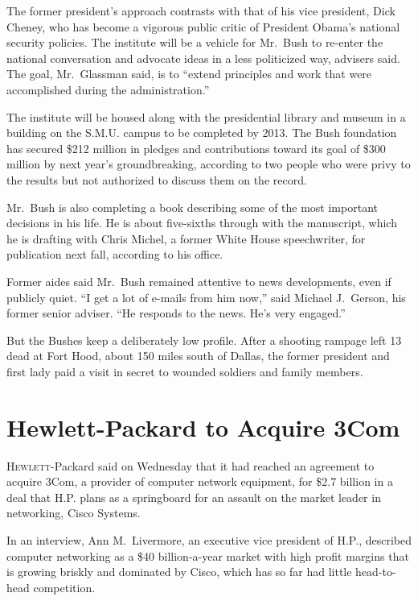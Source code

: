 ﻿\documentclass[12pt]{article}
\begin{document}
The former president's approach contrasts with that of his vice president, Dick Cheney, who has
become a vigorous public critic of President Obama's national security policies. The institute will
be a vehicle for Mr.~Bush to re-enter the national conversation and advocate ideas in a less
politicized way, advisers said. The goal, Mr.~Glassman said, is to ``extend principles and work that
were accomplished during the administration.''

The institute will be housed along with the presidential library and museum in a building on the
S.M.U. campus to be completed by 2013. The Bush foundation has secured \$212 million in pledges and
contributions toward its goal of \$300 million by next year's groundbreaking, according to two
people who were privy to the results but not authorized to discuss them on the record.

Mr.~Bush is also completing a book describing some of the most important decisions in his life. He
is about five-sixths through with the manuscript, which he is drafting with Chris Michel, a former
White House speechwriter, for publication next fall, according to his office.

Former aides said Mr.~Bush remained attentive to news developments, even if publicly quiet. ``I get
a lot of e-mails from him now,'' said Michael J.~Gerson, his former senior adviser. ``He responds to
the news. He's very engaged.''

But the Bushes keep a deliberately low profile. After a shooting rampage left 13 dead at Fort Hood,
about 150 miles south of Dallas, the former president and first lady paid a visit in secret to
wounded soldiers and family members.

\section{Hewlett-Packard to Acquire 3Com}

\lettrine{H}{ewlett}-Packard said on Wednesday that it had reached an
agreement to acquire 3Com, a provider of computer network equipment, for \$2.7 billion in a deal
that H.P. plans as a springboard for an assault on the market leader in networking, Cisco Systems.

In an interview, Ann M.~Livermore, an executive vice president of H.P., described computer
networking as a \$40 billion-a-year market with high profit margins that is growing briskly and
dominated by Cisco, which has so far had little head-to-head competition.
\end{document}
